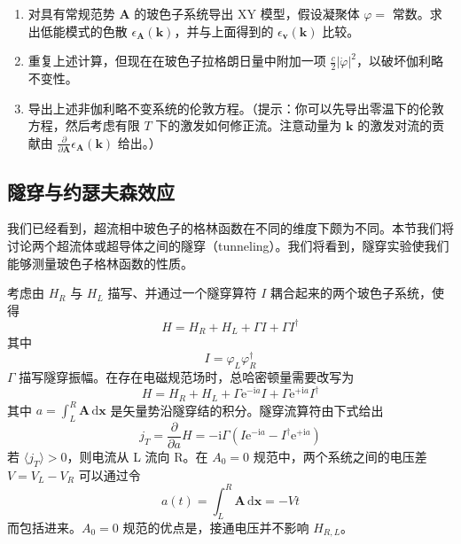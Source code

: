 \begin{enumerate}
\item 对具有常规范势 $\pmb{A}$ 的玻色子系统导出 XY 模型，假设凝聚体 $\varphi=$ 常数。求出低能模式的色散 $\epsilon_{\pmb{A}}(\pmb{k})$，并与上面得到的 $\epsilon_{\pmb{v}}(\pmb{k})$ 比较。
\item 重复上述计算，但现在在玻色子拉格朗日量中附加一项 $\frac{c}{2}|\dot{\varphi}|^{2}$，以破坏伽利略不变性。
\item 导出上述非伽利略不变系统的伦敦方程。（提示：你可以先导出零温下的伦敦方程，然后考虑有限 $T$ 下的激发如何修正流。注意动量为 $\pmb{k}$ 的激发对流的贡献由 $\frac{\partial}{\partial\pmb{A}}\epsilon_{\pmb{A}}(\pmb{k})$ 给出。）
\end{enumerate}

\subsection{隧穿与约瑟夫森效应}

我们已经看到，超流相中玻色子的格林函数在不同的维度下颇为不同。本节我们将讨论两个超流体或超导体之间的隧穿（tunneling）。我们将看到，隧穿实验使我们能够测量玻色子格林函数的性质。

考虑由 $H_{R}$ 与 $H_{L}$ 描写、并通过一个隧穿算符 $I$ 耦合起来的两个玻色子系统，使得
\begin{equation*}
H = H_{R} + H_{L} + \Gamma I + \Gamma I^{\dagger}
\end{equation*}
其中
\begin{equation*}
I = \varphi_{L}\varphi_{R}^{\dagger}
\end{equation*}
$\Gamma$ 描写隧穿振幅。在存在电磁规范场时，总哈密顿量需要改写为
\begin{equation*}
H = H_{R} + H_{L} + \Gamma\mathrm{e}^{-\mathrm{i}a}I + \Gamma\mathrm{e}^{+\mathrm{i}a}I^{\dagger}
\end{equation*}
其中 $a=\int_{L}^{R}\pmb{A}\,\mathrm{d}\pmb{x}$ 是矢量势沿隧穿结的积分。隧穿流算符由下式给出
\begin{equation*}
j_{T} = \frac{\partial}{\partial a}H = -\mathrm{i}\Gamma\left(I\mathrm{e}^{-\mathrm{i}a} - I^{\dagger}\mathrm{e}^{+\mathrm{i}a}\right)
\end{equation*}
若 $\langle j_{T}\rangle>0$，则电流从 L 流向 R。在 $A_{0}=0$ 规范中，两个系统之间的电压差 $V=V_{L}-V_{R}$ 可以通过令
\begin{equation*}
a(t) = \int_{L}^{R}\pmb{A}\,\mathrm{d}\pmb{x} = -Vt
\end{equation*}
而包括进来。$A_{0}=0$ 规范的优点是，接通电压并不影响 $H_{R,L}$。

